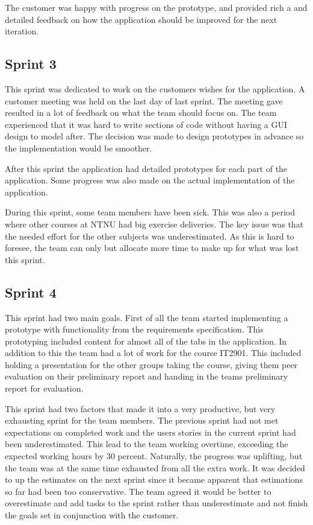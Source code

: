The customer was happy with progress on the prototype, and provided rich a and detailed feedback on how the application should be improved for the next iteration.

\subsection{Sprint 3}
This sprint was dedicated to work on the customers wishes for the application. A customer meeting was held on the last day of last sprint. The meeting gave resulted in a lot of feedback on what the team should focus on. The team experienced that it was hard to write sections of code without having a GUI design to model after. The decision was made to design prototypes in advance so the implementation would be smoother.

After this sprint the application had detailed prototypes for each part of the application.  Some progress was also made on the actual implementation of the application.

During this sprint, some team  members have been sick. This was also a period where other courses at NTNU had big exercise deliveries. The key issue was that the needed effort for the other subjects was underestimated. As this is hard to foresee, the team can only but allocate more time to make up for what was lost this sprint.

\subsection{Sprint 4}
This sprint had two main goals. First of all the team started implementing a prototype with functionality from the requirements specification. This prototyping included content for almost all of the tabs in the application. In addition to this the team had a lot of work for the course IT2901. This included holding a presentation for the other groups taking the course, giving them peer evaluation on their preliminary report and handing in the teams preliminary report for evaluation.

This sprint had two factors that made it into a very productive, but very exhausting sprint for the team members. The previous sprint had not met expectations on completed work and the users stories in the current sprint had been underestimated. This lead to the team working overtime, exceeding the expected working hours by 30 percent. Naturally, the progress was uplifting, but the team was at the same time exhausted from all the extra work. It was decided to up the estimates on the next sprint since it became apparent that estimations so far had been too conservative. The team agreed it would be better to overestimate and add tasks to the sprint rather than underestimate and not finish the goals set in conjunction with the customer.

